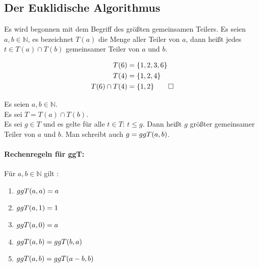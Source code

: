 \subsection{Der Euklidische Algorithmus}
Es wird begonnen mit dem Begriff des größten gemeinsamen Teilers.
Es seien $a,b \in  \mathbb{N}$, es bezeichnet $T(a)$ die Menge aller Teiler von $a$,
dann heißt jedes $t \in T(a) \cap T(b)$ gemeinsamer Teiler von $a$ und $b$.

\begin{example}
  \begin{align*}
    T(6)           & = \{1,2,3,6\}      \\
    T(4)           & = \{1,2,4\}        \\
    T(6) \cap T(4) & = \{1,2\} \qedhere
  \end{align*}
\end{example}

\begin{definition}
  Es seien $a,b \in \mathbb{N}$.\\
  Es sei $T = T(a) \cap T(b)$.\\
  Es sei $g \in T$ und es gelte für alle $t \in T$: $t \leq g$. Dann heißt $g$
  größter gemeinsamer Teiler von $a$ und $b$.
  Man schreibt auch $g = ggT(a,b)$.
\end{definition}

\paragraph{Rechenregeln für ggT:}
Für $a,b \in \mathbb{N}$ gilt \parencite{SITE:euklid}:
\begin{enumerate}[ref=(\arabic*)]
  \item $ggT(a,a) = a$ \label{enum:ggT1}
  \item $ggT(a,1) = 1$ \label{enum:ggT2}
  \item $ggT(a,0) = a$ \label{enum:ggT3}
  \item $ggT(a,b) = ggT(b,a)$ \label{enum:ggT4}
  \item $ggT(a,b) = ggT(a - b,b)$ \label{enum:ggT5}
\end{enumerate}

